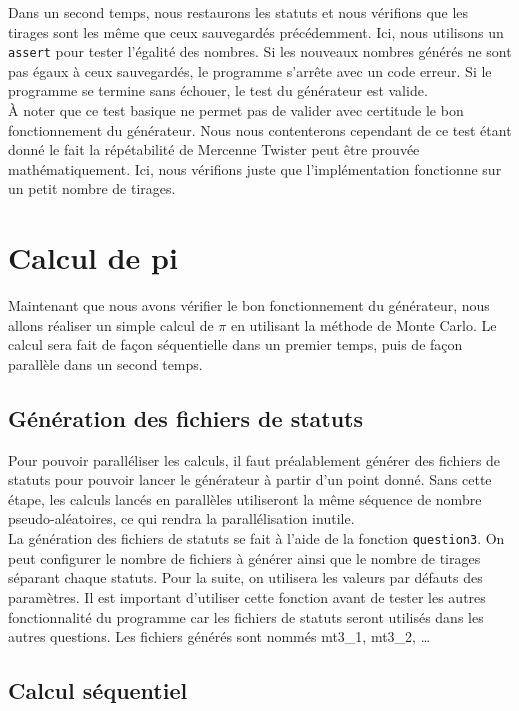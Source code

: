 \documentclass[a4paper]{article}
\begin{document}
Dans un second temps, nous restaurons les statuts et nous vérifions que les
tirages sont les même que ceux sauvegardés précédemment. Ici, nous utilisons un
\lstinline{assert} pour tester l'égalité des nombres. Si les nouveaux nombres
générés ne sont pas égaux à ceux sauvegardés, le programme s'arrête avec un code
erreur. Si le programme se termine sans échouer, le test du générateur est
valide.\\

À noter que ce test basique ne permet pas de valider avec certitude le bon
fonctionnement du générateur. Nous nous contenterons cependant de ce test étant
donné le fait la répétabilité de Mercenne Twister peut être prouvée
mathématiquement. Ici, nous vérifions juste que l'implémentation fonctionne sur
un petit nombre de tirages.

\section{Calcul de pi}

Maintenant que nous avons vérifier le bon fonctionnement du générateur, nous
allons réaliser un simple calcul de $\pi$ en utilisant la méthode de Monte
Carlo. Le calcul sera fait de façon séquentielle dans un premier temps, puis de
façon parallèle dans un second temps.

\subsection{Génération des fichiers de statuts}

Pour pouvoir paralléliser les calculs, il faut préalablement générer des
fichiers de statuts pour pouvoir lancer le générateur à partir d'un point donné.
Sans cette étape, les calculs lancés en parallèles utiliseront la même séquence
de nombre pseudo-aléatoires, ce qui rendra la parallélisation inutile.\\

La génération des fichiers de statuts se fait à l'aide de la fonction
\lstinline{question3}. On peut configurer le nombre de fichiers à générer ainsi
que le nombre de tirages séparant chaque statuts. Pour la suite, on utilisera
les valeurs par défauts des paramètres. Il est important d'utiliser cette
fonction avant de tester les autres fonctionnalité du programme car les fichiers
de statuts seront utilisés dans les autres questions. Les fichiers générés sont
nommés mt3\_1, mt3\_2, \dots

\subsection{Calcul séquentiel}
\end{document}
